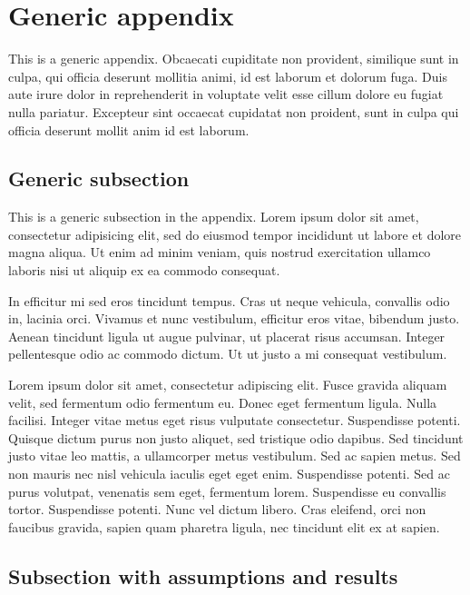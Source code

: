 \documentclass[letterpaper,11pt,leqno]{article}
\newcommand{\bib}{paper.bib}
\begin{document}

\appendix

\section{Generic appendix}\label{a:appendix1}

This is a generic appendix. Obcaecati cupiditate non provident, similique sunt in culpa, qui officia deserunt mollitia animi, id est laborum et dolorum fuga. Duis aute irure dolor in reprehenderit in voluptate velit esse cillum dolore eu fugiat nulla pariatur. Excepteur sint occaecat cupidatat non proident, sunt in culpa qui officia deserunt mollit anim id est laborum. 

\subsection{Generic subsection} 

This is a generic subsection in the appendix. Lorem ipsum dolor sit amet, consectetur adipisicing elit, sed do eiusmod tempor incididunt ut labore et dolore magna aliqua. Ut enim ad minim veniam, quis nostrud exercitation ullamco laboris nisi ut aliquip ex ea commodo consequat. 

In efficitur mi sed eros tincidunt tempus. Cras ut neque vehicula, convallis odio in, lacinia orci. Vivamus et nunc vestibulum, efficitur eros vitae, bibendum justo. Aenean tincidunt ligula ut augue pulvinar, ut placerat risus accumsan. Integer pellentesque odio ac commodo dictum. Ut ut justo a mi consequat vestibulum. 

Lorem ipsum dolor sit amet, consectetur adipiscing elit. Fusce gravida aliquam velit, sed fermentum odio fermentum eu. Donec eget fermentum ligula. Nulla facilisi. Integer vitae metus eget risus vulputate consectetur. Suspendisse potenti. Quisque dictum purus non justo aliquet, sed tristique odio dapibus. Sed tincidunt justo vitae leo mattis, a ullamcorper metus vestibulum. Sed ac sapien metus. Sed non mauris nec nisl vehicula iaculis eget eget enim. Suspendisse potenti. Sed ac purus volutpat, venenatis sem eget, fermentum lorem. Suspendisse eu convallis tortor. Suspendisse potenti. Nunc vel dictum libero. Cras eleifend, orci non faucibus gravida, sapien quam pharetra ligula, nec tincidunt elit ex at sapien. 

\subsection{Subsection with assumptions and results}
\end{document}
